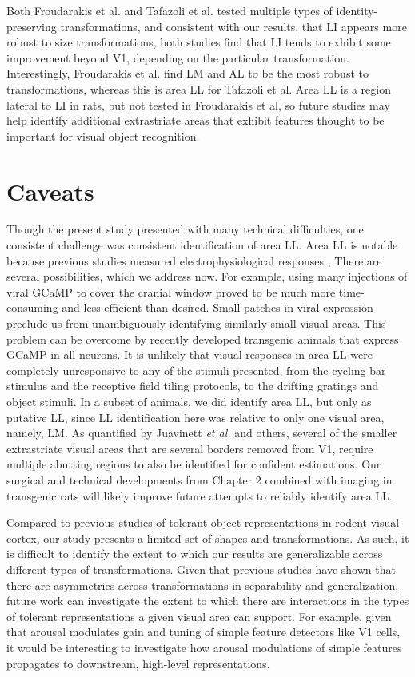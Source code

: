 Both Froudarakis et al. and Tafazoli et al. tested multiple types of identity-preserving transformations, and consistent with our results, that LI appears more robust to size transformations, both studies find that LI tends to exhibit some improvement beyond V1, depending on the particular transformation. Interestingly, Froudarakis et al. find LM and AL to be the most robust to transformations, whereas this is area LL for Tafazoli et al. Area LL is a region lateral to LI in rats, but not tested in Froudarakis et al, so future studies may help identify additional extrastriate areas that exhibit features thought to be important for visual object recognition.  

\section{Caveats}
Though the present study presented with many technical difficulties, one consistent challenge was consistent identification of area LL. Area LL is notable because previous studies measured electrophysiological responses , There are several possibilities, which we address now. For example, using many injections of viral GCaMP to cover the cranial window proved to be much more time-consuming and less efficient than desired. Small patches in viral expression preclude us from unambiguously identifying similarly small visual areas. This problem can be overcome by recently developed transgenic animals that express GCaMP in all neurons\cite{Scott2018}. It is unlikely that visual responses in area LL were completely unresponsive to any of the stimuli presented, from the cycling bar stimulus and the receptive field tiling protocols, to the drifting gratings and object stimuli. In a subset of animals, we did identify area LL, but only as putative LL, since LL identification here was relative to only one visual area, namely, LM. As quantified by Juavinett \textit{et al.} and others\cite{Juavinett2017}, several of the smaller extrastriate visual areas that are several borders removed from V1, require multiple abutting regions to also be identified for confident estimations. Our surgical and technical developments from Chapter 2 combined with imaging in transgenic rats will likely improve future attempts to reliably identify area LL. 

Compared to previous studies of tolerant object representations in rodent visual cortex, our study presents a limited set of shapes and transformations. As such, it is difficult to identify the extent to which our results are generalizable across different types of transformations. Given that previous studies have shown that there are asymmetries across transformations in separability and generalization, future work can investigate the extent to which there are interactions in the types of tolerant representations a given visual area can support. For example, given that arousal modulates gain and tuning of simple feature detectors like V1 cells, it would be interesting to investigate how arousal modulations of simple features propagates to downstream, high-level representations.

